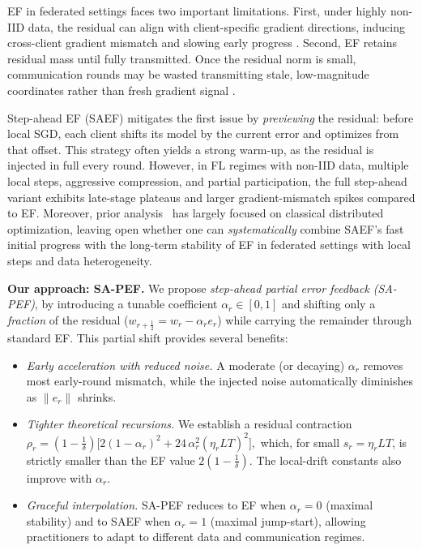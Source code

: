 \documentclass{article} %
\begin{document}
EF in federated settings faces two important limitations. First, under highly non-IID data, the residual can align with client-specific gradient directions, inducing cross-client gradient mismatch and slowing early progress \citep{hsu2020saef, karimireddy2020scaffold}. Second, EF retains residual mass until fully transmitted. Once the residual norm is small, communication rounds may be wasted transmitting stale, low-magnitude coordinates rather than fresh gradient signal \citep{li2023analysis}.

Step-ahead EF (SAEF) \citep{xu2021step} mitigates the first issue by \emph{previewing} the residual: before local SGD, each client shifts its model by the current error and optimizes from that offset. This strategy often yields a strong warm-up, as the residual is injected in full every round. However, in FL regimes with non-IID data, multiple local steps, aggressive compression, and partial participation, the full step-ahead variant exhibits late-stage plateaus and larger gradient-mismatch spikes compared to EF.
Moreover, prior analysis~\citep{xu2021step} has largely focused on classical distributed optimization, leaving open whether one can \emph{systematically} combine SAEF's fast initial progress with the long-term stability of EF in federated settings with local steps and data heterogeneity.

\textbf{Our approach: SA-PEF.}
We propose \emph{step-ahead partial error feedback (SA-PEF)}, by introducing a tunable coefficient $\alpha_r\in[0,1]$ and shifting only a \emph{fraction} of the residual ($w_{r+\frac12}=w_r-\alpha_r e_r$) while carrying the remainder through standard EF. This partial shift provides several benefits:
\begin{itemize}[leftmargin=*,itemsep=0pt,topsep=0pt,parsep=0pt]
  \item \emph{Early acceleration with reduced noise.} A moderate (or decaying) $\alpha_r$ removes most early-round mismatch, while the injected noise automatically diminishes as $\|e_r\|$ shrinks.
  \item \emph{Tighter theoretical recursions.} We establish a residual contraction
        \(
        \rho_r=(1-\tfrac1\delta)\bigl[2(1-\alpha_r)^2+24\,\alpha_r^2(\eta_rLT)^2\bigr],
        \)
        which, for small $s_r=\eta_rLT$, is strictly smaller than the EF value $2(1-\tfrac1\delta)$. The local-drift constants also improve with $\alpha_r$.
  \item \emph{Graceful interpolation.} SA-PEF reduces to EF when $\alpha_r=0$ (maximal stability) and to SAEF when $\alpha_r=1$ (maximal jump-start), allowing practitioners to adapt to different data and communication regimes.
\end{itemize}
\end{document}
